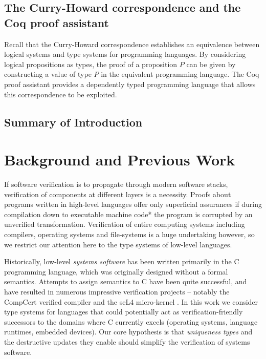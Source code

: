 \documentclass[]{unswthesis}
\begin{document}
\section{The Curry-Howard correspondence and the Coq proof assistant}

Recall that the Curry-Howard correspondence establishes an equivalence between logical systems and type systems for programming languages. By considering logical propositions as types, the proof of a proposition $P$ can be given by constructing a value of type $P$ in the equivalent programming language. The Coq proof assistant provides a dependently typed programming language that allows this correspondence to be exploited.

\section{Summary of Introduction}

\chapter{Background and Previous Work}
\label{ch:background}

If software verification is to propagate through modern software stacks, verification of components at different layers is a necessity. Proofs about programs written in high-level languages offer only superficial assurances if during compilation down to executable machine code* the program is corrupted by an unverified transformation. Verification of entire computing systems including compilers, operating systems and file-systems is a huge undertaking however, so we restrict our attention here to the type systems of low-level languages.

Historically, low-level \textit{systems software} has been written primarily in the C programming language, which was originally designed without a formal semantics. Attempts to assign semantics to C have been quite successful, and have resulted in numerous impressive verification projects -- notably the CompCert verified compiler \cite{leroy09} and the seL4 micro-kernel \cite{klein14}. In this work we consider type systems for languages that could potentially act as verification-friendly successors to the domains where C currently excels (operating systems, language runtimes, embedded devices). Our core hypothesis is that \textit{uniqueness types} and the destructive updates they enable should simplify the verification of systems software.
\end{document}
